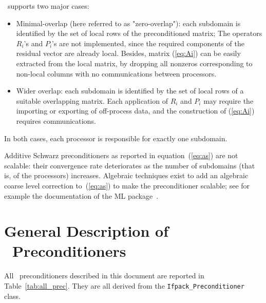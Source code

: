 \ifpack\ supports two major cases:
\begin{itemize}
\item Minimal-overlap (here referred to as "zero-overlap"): each subdomain
is identified by the set of local rows of the preconditioned matrix;
The operators $R_i$'s and $P_i$'s are not implemented, since the
required components of the residual vector are already local. Besides, matrix
(\ref{eq:Ai}) can be easily extracted from the local matrix, by dropping all
nonzeros corresponding to non-local columns with no 
communications between processors. 
\item Wider overlap: each subdomain is identified by the set of local rows
of a suitable overlapping matrix.
Each application of $R_i$ and $P_i$ may require the
importing or exporting of
off-process data, and the construction of (\ref{eq:Ai}) requires
communications.

\end{itemize}
In both cases, each processor is responsible for exactly one subdomain.

\begin{remark}
Additive Schwarz preconditioners as reported in equation~(\ref{eq:as}) 
are not scalable: their convergence rate
deteriorates as the number of subdomains (that is, of the processors)
increases. Algebraic techniques
exist to add an algebraic coarse level correction to~(\ref{eq:as}) to make the
preconditioner scalable; 
see for example the documentation of the ML
package~\cite{ml-guide}.
\end{remark}

\section{General Description of \ifpack\ Preconditioners}
\label{sec:prec}

All \ifpack\ preconditioners described in this document
are reported in Table~\ref{tab:all_prec}. They are all derived from the 
\verb!Ifpack_Preconditioner!
class.


